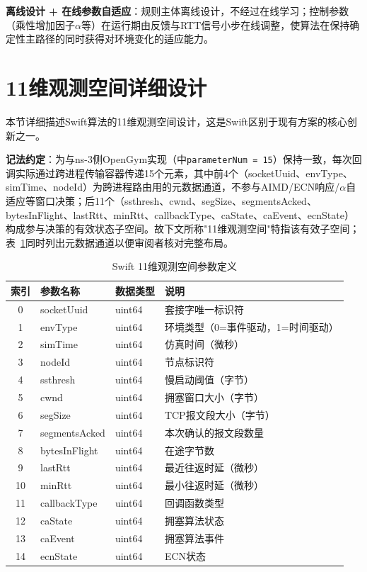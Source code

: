 \textbf{离线设计 + 在线参数自适应}：规则主体离线设计，不经过在线学习；控制参数（乘性增加因子$\alpha$等）在运行期由反馈与RTT信号小步在线调整，使算法在保持确定性主路径的同时获得对环境变化的适应能力。

\section{11维观测空间详细设计}

本节详细描述Swift算法的11维观测空间设计，这是Swift区别于现有方案的核心创新之一。

\textbf{记法约定}：为与ns-3侧OpenGym实现（中\texttt{parameterNum = 15}）保持一致，每次回调实际通过跨进程传输容器传递15个元素，其中前4个（socketUuid、envType、simTime、nodeId）为跨进程路由用的元数据通道，不参与AIMD/ECN响应/$\alpha$自适应等窗口决策；后11个（ssthresh、cwnd、segSize、segmentsAcked、bytesInFlight、lastRtt、minRtt、callbackType、caState、caEvent、ecnState）构成参与决策的有效状态子空间。故下文所称"11维观测空间"特指该有效子空间；表~\ref{tab:observation}同时列出元数据通道以便审阅者核对完整布局。

\begin{table}[htbp]
\centering
\caption{Swift 11维观测空间参数定义}
\label{tab:observation}
\begin{tabular}{|c|l|l|l|}
\hline
\textbf{索引} & \textbf{参数名称} & \textbf{数据类型} & \textbf{说明} \\
\hline
0 & socketUuid & uint64 & 套接字唯一标识符 \\
1 & envType & uint64 & 环境类型（0=事件驱动，1=时间驱动） \\
2 & simTime & uint64 & 仿真时间（微秒） \\
3 & nodeId & uint64 & 节点标识符 \\
4 & ssthresh & uint64 & 慢启动阈值（字节） \\
5 & cwnd & uint64 & 拥塞窗口大小（字节） \\
6 & segSize & uint64 & TCP报文段大小（字节） \\
7 & segmentsAcked & uint64 & 本次确认的报文段数量 \\
8 & bytesInFlight & uint64 & 在途字节数 \\
9 & lastRtt & uint64 & 最近往返时延（微秒） \\
10 & minRtt & uint64 & 最小往返时延（微秒） \\
11 & callbackType & uint64 & 回调函数类型 \\
12 & caState & uint64 & 拥塞算法状态 \\
13 & caEvent & uint64 & 拥塞算法事件 \\
14 & ecnState & uint64 & ECN状态 \\
\hline
\end{tabular}
\end{table}

